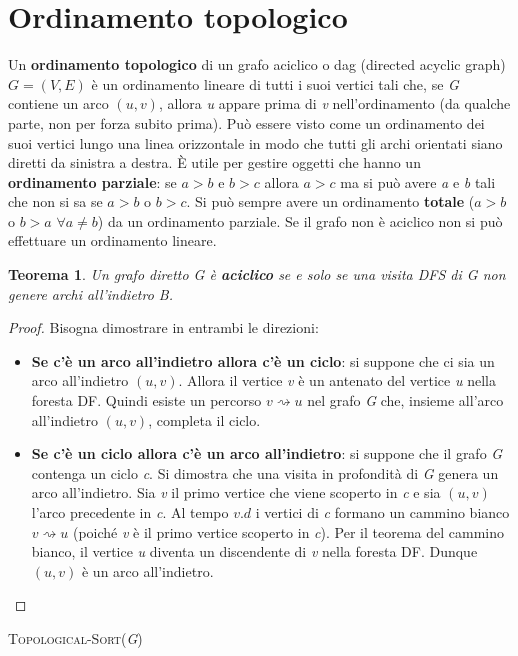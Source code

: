 \documentclass[10pt, a4paper]{report}
\newtheorem{theorem}{Teorema}[chapter]
\begin{document}
\section{Ordinamento topologico}
Un \textbf{ordinamento topologico} di un grafo aciclico o dag (directed acyclic graph) $G = (V,E)$ è un ordinamento lineare di tutti i suoi vertici tali che, se \textit{G} contiene un arco $(u,v)$, allora \textit{u} appare prima di \textit{v} nell'ordinamento (da qualche parte, non per forza subito prima). Può essere visto come un ordinamento dei suoi vertici lungo una linea orizzontale in modo che tutti gli archi orientati siano diretti da sinistra a destra. È utile per gestire oggetti che hanno un \textbf{ordinamento parziale}: se $a > b$ e $b > c$ allora $a > c$ ma si può avere \textit{a} e \textit{b} tali che non si sa se $a > b$ o $b > c$. Si può sempre avere un ordinamento \textbf{totale} ($a > b$ o $b > a$ $\forall a \neq b$) da un ordinamento parziale. Se il grafo non è aciclico non si può effettuare un ordinamento lineare.
\begin{theorem}
Un grafo diretto \textit{G} è \textbf{aciclico} se e solo se una visita \textsc{DFS} di \textit{G} non genere archi all'indietro B.
\end{theorem}
\begin{proof}
Bisogna dimostrare in entrambi le direzioni:
\begin{itemize}
\item\textbf{Se c'è un arco all'indietro allora c'è un ciclo}: si suppone che ci sia un arco all'indietro $(u,v)$. Allora il vertice \textit{v} è un antenato del vertice \textit{u} nella foresta DF. Quindi esiste un percorso $v \rightsquigarrow u$ nel grafo \textit{G} che, insieme all'arco all'indietro $(u,v)$, completa il ciclo.
\item\textbf{Se c'è un ciclo allora c'è un arco all'indietro}: si suppone che il grafo \textit{G} contenga un ciclo \textit{c}. Si dimostra che una visita in profondità di \textit{G} genera un arco all'indietro. Sia \textit{v} il primo vertice che viene scoperto in \textit{c} e sia $(u,v)$ l'arco precedente in \textit{c}. Al tempo $v.d$ i vertici di \textit{c} formano un cammino bianco $v \rightsquigarrow u$ (poiché \textit{v} è il primo vertice scoperto in \textit{c}). Per il teorema del cammino bianco, il vertice \textit{u} diventa un discendente di \textit{v} nella foresta DF. Dunque $(u,v)$ è un arco all'indietro.
\end{itemize}
\end{proof}
\textsc{Topological-Sort(\textit{G})}\\
\end{document}

